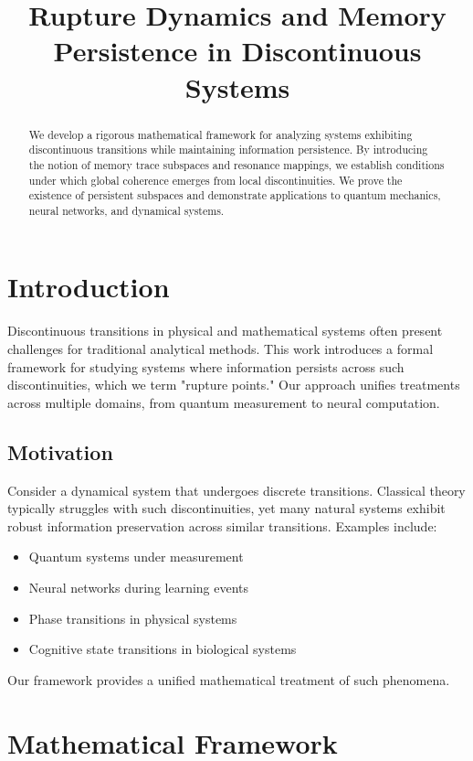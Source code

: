 \documentclass[12pt]{article}
\title{Rupture Dynamics and Memory Persistence in Discontinuous Systems}
\author{}
\date{}
\theoremstyle{definition}
\theoremstyle{plain}
\begin{document}
\maketitle

\begin{abstract}
We develop a rigorous mathematical framework for analyzing systems exhibiting discontinuous transitions while maintaining information persistence. By introducing the notion of memory trace subspaces and resonance mappings, we establish conditions under which global coherence emerges from local discontinuities. We prove the existence of persistent subspaces and demonstrate applications to quantum mechanics, neural networks, and dynamical systems.
\end{abstract}

\section{Introduction}

Discontinuous transitions in physical and mathematical systems often present challenges for traditional analytical methods. This work introduces a formal framework for studying systems where information persists across such discontinuities, which we term "rupture points." Our approach unifies treatments across multiple domains, from quantum measurement to neural computation.

\subsection{Motivation}

Consider a dynamical system that undergoes discrete transitions. Classical theory typically struggles with such discontinuities, yet many natural systems exhibit robust information preservation across similar transitions. Examples include:
\begin{itemize}
    \item Quantum systems under measurement
    \item Neural networks during learning events
    \item Phase transitions in physical systems
    \item Cognitive state transitions in biological systems
\end{itemize}

Our framework provides a unified mathematical treatment of such phenomena.

\section{Mathematical Framework}
\end{document}
